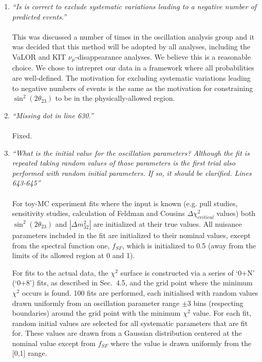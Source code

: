 \begin{enumerate}
\vspace{5 mm}
\item
{\em
  ``Is is correct to exclude systematic variations leading to a negative number of predicted events.''
}\\
\\
This was discussed a number of times in the oscillation analysis group and it was decided that
this method will be adopted by all analyses, including the VaLOR and KIT $\nu_{\mu}$-disappearance analyses.
We believe this is a reasonable choice.
We chose to intrepret our data in a framework where all probabilities are well-defined.
The motivation for excluding systematic variations leading to negative numbers of events is
the same as the motivation for constraining $\sin^{2}(2\theta_{23})$ to be in the physically-allowed region.
\vspace{5 mm}
\item
{\em
  ``Missing dot in line 630.''
}\\
\\
Fixed.

\vspace{5 mm}
\item
{\em
  ``What is the initial value for the oscillation parameters? 
    Although the fit is repeated taking random values of those parameters is the first trial 
    also performed with random initial parameters. If so, it should be clarified. Lines 643-645''
}\\
\\
For toy-MC experiment fits where the input is known (e.g. pull studies, sensitivity studies,
calculation of Feldman and Cousins ${\Delta}\chi^{2}_{critical}$ values)
both $\sin^{2}(2\theta_{23})$ and $|\Delta m^2_{32}|$ are initialized at their true values.
All nuisance parameters included in the fit are initialized to their nominal values, except from the 
spectral function one, $f_{SF}$, which is initialized to 0.5 (away from the limits of its allowed region at 0 and 1). 

For fits to the actual data, the $\chi^2$ surface is constructed via a series of `0+N' (`0+8') fits,
as described in Sec.\ 4.5, and the grid point where the minimum $\chi^2$ occurs is found.
100 fits are performed, each initialised with random values drawn uniformly from an oscillation parameter
range $\pm$3 bins (respecting boundaries) around the grid point with the minimum $\chi^2$ value.
For each fit, random initial values are selected for all systematic parameters that are fit for.
These values are drawn from a Gaussian distribution centered at the nominal value 
except from $f_{SF}$ where the value is drawn uniformly from the [0,1] range.


\end{enumerate}
